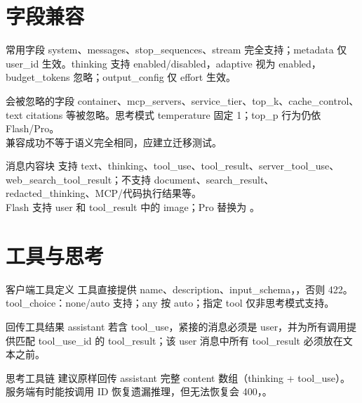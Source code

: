 \documentclass[aspectratio=169,UTF8]{ctexbeamer}
\begin{document}
\section{字段兼容}
\begin{frame}{常用字段}
system、messages、stop\_sequences、stream 完全支持；metadata 仅 user\_id 生效。thinking 支持 enabled/disabled，adaptive 视为 enabled，budget\_tokens 忽略；output\_config 仅 effort 生效。
\end{frame}
\begin{frame}{会被忽略的字段}
container、mcp\_servers、service\_tier、top\_k、cache\_control、text citations 等被忽略。思考模式 temperature 固定 1；top\_p 行为仍依 Flash/Pro。\\[8pt]
兼容成功不等于语义完全相同，应建立迁移测试。
\end{frame}
\begin{frame}{消息内容块}
支持 text、thinking、tool\_use、tool\_result、server\_tool\_use、web\_search\_tool\_result；不支持 document、search\_result、redacted\_thinking、MCP/代码执行结果等。\\[8pt]
Flash 支持 user 和 tool\_result 中的 image；Pro 替换为 。
\end{frame}
\section{工具与思考}
\begin{frame}{客户端工具定义}
工具直接提供 name、description、input\_schema，，否则 422。\\[8pt]
tool\_choice：none/auto 支持；any 按 auto；指定 tool 仅非思考模式支持。
\end{frame}
\begin{frame}{回传工具结果}
assistant 若含 tool\_use，紧接的消息必须是 user，并为所有调用提供匹配 tool\_use\_id 的 tool\_result；该 user 消息中所有 tool\_result 必须放在文本之前。
\end{frame}
\begin{frame}{思考工具链}
建议原样回传 assistant 完整 content 数组（thinking + tool\_use）。服务端有时能按调用 ID 恢复遗漏推理，但无法恢复会 400，。
\end{frame}
\end{document}
